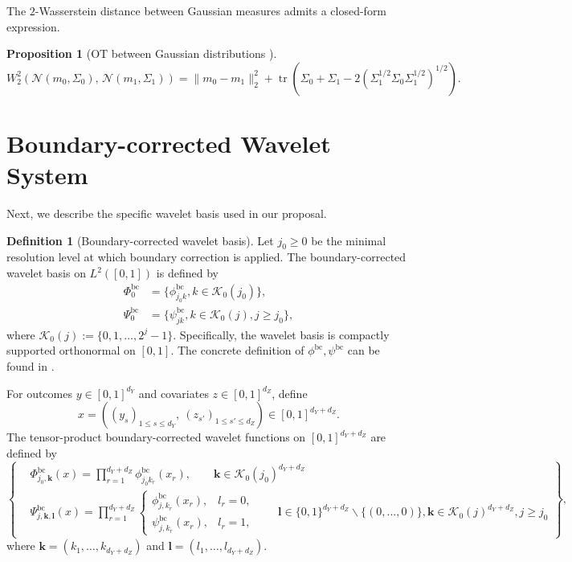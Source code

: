 \documentclass{article}
\theoremstyle{plain}
\newtheorem{proposition}{Proposition}[section]
\theoremstyle{definition}
\newtheorem{definition}{Definition}[section]
\def\calK{\mathcal{K}}
\theoremstyle{plain}
\def\calK{\mathcal{K}}
\begin{document}
The $2$-Wasserstein distance between Gaussian measures admits a closed-form expression.
\begin{proposition}[OT between Gaussian distributions \parencite{gelbrich1990}]\label{prop:Gelbrich}
    \begin{equation*}
    W_2^2\!\left(\mathcal N(m_0,\Sigma_0),\,\mathcal N(m_1,\Sigma_1)\right)
    =
    \|m_0-m_1\|_2^2
    +
    \operatorname{tr}\!\left(
    \Sigma_0+\Sigma_1
    -
    2(\Sigma_1^{1/2}\Sigma_0\Sigma_1^{1/2})^{1/2}
    \right).
    \end{equation*}
\end{proposition}


\section{Boundary-corrected Wavelet System}\label{sec:bc_wavelet}
Next, we describe the specific wavelet basis used in our proposal.
\begin{definition}[Boundary-corrected wavelet basis]
Let $j_0\ge 0$ be the minimal resolution level at which boundary correction is applied. The boundary-corrected wavelet basis on $L^2([0,1])$ is defined by
\begin{align*}
    \Phi^{\mathrm{bc}}_0 &= \{\phi^{\mathrm{bc}}_{j_0 k}, k \in \calK_0(j_0)\},\\
    \Psi^{\mathrm{bc}}_0 &= \{\psi^{\mathrm{bc}}_{j k}, k \in \calK_0(j), j \geq j_0\},
\end{align*}
where $\calK_0(j) := \{0,1,\dots,2^j-1\}$. Specifically, the wavelet basis is compactly supported orthonormal on $[0,1]$. The concrete definition of $\phi^{\mathrm{bc}}, \psi^{\mathrm{bc}}$ can be found in \cite[Section A.2.1]{manole2024plugin}.

For outcomes $y\in[0,1]^{d_Y}$ and covariates $z\in [0,1]^{d_Z}$, define
\[
x=\left((y_s)_{1\le s\le d_Y},\ (z_{s'})_{1\le s'\le d_Z}\right)
\in[0,1]^{d_Y+d_Z}.
\]
The tensor-product boundary-corrected wavelet functions on $[0,1]^{d_Y+d_Z}$ are defined by
\[
\left\{
    \begin{aligned}
    &\Phi^{\mathrm{bc}}_{j_0, \mathbf k}(x) = \prod_{r=1}^{d_Y+d_Z} \phi^{\mathrm{bc}}_{j_0 k_r}(x_r), \qquad \mathbf k \in \calK_0(j_0)^{d_Y+d_Z}\\
    &\Psi^{\mathrm{bc}}_{j,\mathbf k,\mathbf l}(x)
    =
    \prod_{r=1}^{d_Y+d_Z}
    \begin{cases}
    \phi^{\mathrm{bc}}_{j,k_r}(x_r), & l_r = 0,\\[6pt]
    \psi^{\mathrm{bc}}_{j,k_r}(x_r), & l_r = 1,
    \end{cases}
    \qquad \mathbf l \in\{0,1\}^{d_Y+d_Z} \backslash \{(0,...,0)\}, \mathbf k \in \calK_0(j)^{d_Y+d_Z}, j \geq j_0
    \end{aligned}
\right\},
\]
where $\mathbf k=(k_1,\ldots,k_{d_Y+d_Z})$ and
$\mathbf l=(l_1,\ldots,l_{d_Y+d_Z})$.
\end{definition}
\end{document}
